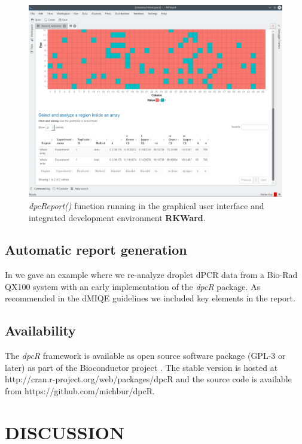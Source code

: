 \documentclass[a4,center,fleqn]{NAR}
\begin{document}
\begin{figure}[t]
\begin{center}
\includegraphics[width=17cm]{GUI_RKWard_1.png}
\end{center}
\caption{\textit{dpcReport()} function running in the graphical user interface and integrated development environment \textbf{RKWard}.}
\label{GUI_RKWard_1}
\end{figure}

\subsection{Automatic report generation}

In \cite{rodiger_r_2015} we gave an example where we re-analyze droplet dPCR 
data from a Bio-Rad QX100 system with an early implementation of the 
\textit{dpcR} package. As recommended in the dMIQE guidelines 
\cite{huggett_digital_2013} we included key elements in the report.
\subsection{Availability}

The \textit{dpcR} framework is available as open source software package (GPL-3 
or later) as part of the Bioconductor project \cite{gentleman_2004}. The stable 
version is hosted at http://cran.r-project.org/web/packages/dpcR and the source 
code is available from  https://github.com/michbur/dpcR.

\section{DISCUSSION}
\end{document}
